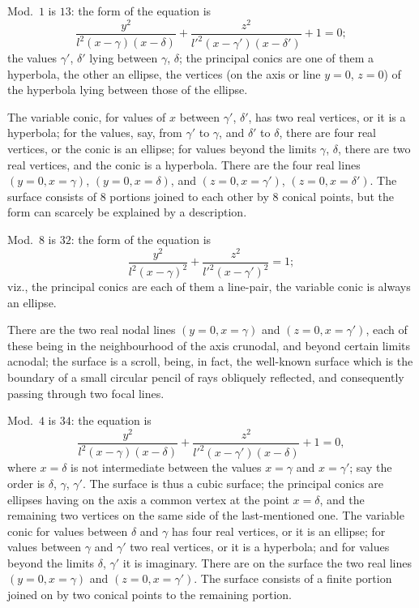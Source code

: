 \documentclass[11pt,a4paper]{article}
\begin{document}
\medskip
Mod.\ $1$ is $13$: the form of the equation is
\[
\frac{y^2}{l^2(x - \gamma)(x - \delta)} + \frac{z^2}{l'^2(x - \gamma')(x - \delta')} + 1 = 0;
\]
the values $\gamma'$, $\delta'$ lying between $\gamma$, $\delta$; the
principal conics are one of them a hyperbola, the other an ellipse, the
vertices (on the axis or line $y = 0$, $z = 0$) of the hyperbola lying
between those of the ellipse.

The variable conic, for values of $x$ between $\gamma'$, $\delta'$, has
two real vertices, or it is a hyperbola; for the values, say, from
$\gamma'$ to $\gamma$, and $\delta'$ to $\delta$, there are four real
vertices, or the conic is an ellipse; for values beyond the limits
$\gamma$, $\delta$, there are two real vertices, and the conic is a
hyperbola. There are the four real lines $(y = 0, x = \gamma)$,
$(y = 0, x = \delta)$, and $(z = 0, x = \gamma')$, $(z = 0, x = \delta')$.
The surface consists of $8$ portions joined to each other by $8$ conical
points, but the form can scarcely be explained by a description.

\medskip
Mod.\ $8$ is $32$: the form of the equation is
\[
\frac{y^2}{l^2(x - \gamma)^2} + \frac{z^2}{l'^2(x - \gamma')^2} = 1;
\]
viz., the principal conics are each of them a line-pair, the variable
conic is always an ellipse.

There are the two real nodal lines $(y = 0, x = \gamma)$ and
$(z = 0, x = \gamma')$, each of these being in the neighbourhood of the
axis crunodal, and beyond certain limits acnodal; the surface is a
scroll, being, in fact, the well-known surface which is the boundary of
a small circular pencil of rays obliquely reflected, and consequently
passing through two focal lines.

\medskip
Mod.\ $4$ is $34$: the equation is
\[
\frac{y^2}{l^2(x - \gamma)(x - \delta)} + \frac{z^2}{l'^2(x - \gamma')(x - \delta)} + 1 = 0,
\]
where $x = \delta$ is not intermediate between the values $x = \gamma$
and $x = \gamma'$; say the order is $\delta$, $\gamma$, $\gamma'$. The
surface is thus a cubic surface; the principal conics are ellipses having
on the axis a common vertex at the point $x = \delta$, and the remaining
two vertices on the same side of the last-mentioned one. The variable
conic for values between $\delta$ and $\gamma$ has four real vertices, or
it is an ellipse; for values between $\gamma$ and $\gamma'$ two real
vertices, or it is a hyperbola; and for values beyond the limits $\delta$,
$\gamma'$ it is imaginary. There are on the surface the two real lines
$(y = 0, x = \gamma)$ and $(z = 0, x = \gamma')$. The surface consists
of a finite portion joined on by two conical points to the remaining portion.
\end{document}
